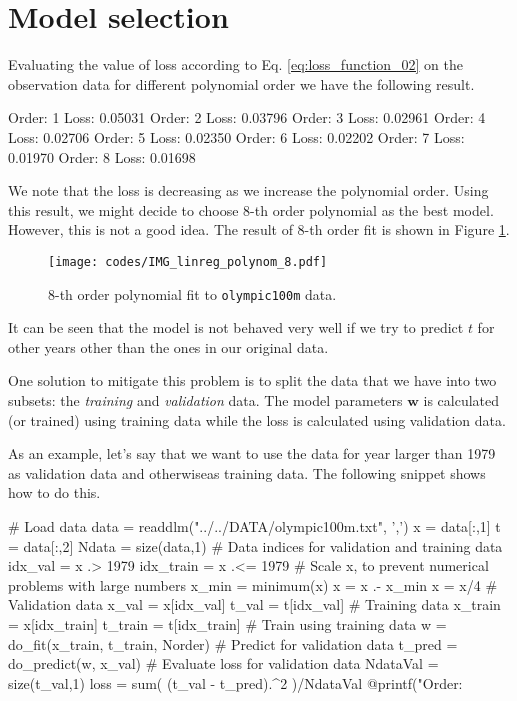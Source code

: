 \documentclass[a4paper,11pt]{article} %
\newcommand{\txtinline}[1]{\texttt{#1}}
\begin{document}
\section{Model selection}

Evaluating the value of loss according to Eq. \eqref{eq:loss_function_02}
on the observation data for different polynomial order
we have the following result.
\begin{textcode}
Order:   1 Loss:    0.05031
Order:   2 Loss:    0.03796
Order:   3 Loss:    0.02961
Order:   4 Loss:    0.02706
Order:   5 Loss:    0.02350
Order:   6 Loss:    0.02202
Order:   7 Loss:    0.01970
Order:   8 Loss:    0.01698    
\end{textcode}
We note that the loss is decreasing as we increase the polynomial order.
Using this result, we might decide to choose 8-th order polynomial as the
best model. However, this is not a good idea.
The result of 8-th order fit is shown in Figure \ref{fig:8th_order_fit}.
\begin{figure}[H]
\begin{center}
\texttt{[image: codes/IMG\_linreg\_polynom\_8.pdf]}
\end{center}
\caption{8-th order polynomial fit to \txtinline{olympic100m} data.}
\label{fig:8th_order_fit}
\end{figure}
It can be seen that the model is not behaved very well if we try to predict
$t$ for other years other than the ones in our original data.

One solution to mitigate this problem is to split the data that we have
into two subsets: the \emph{training} and \emph{validation} data.
The model parameters $\mathbf{w}$ is calculated (or trained) using
training data while the loss is calculated using validation data.

As an example, let's say that we want to use the data for year larger
than 1979 as validation data and otherwiseas training data. The following
snippet shows how to do this.
\begin{juliacode}
# Load data
data = readdlm("../../DATA/olympic100m.txt", ',')
x = data[:,1]
t = data[:,2]
Ndata = size(data,1)
# Data indices for validation and training data
idx_val = x .> 1979
idx_train = x .<= 1979
# Scale x, to prevent numerical problems with large numbers
x_min = minimum(x)
x = x .- x_min
x = x/4
# Validation data
x_val = x[idx_val]
t_val = t[idx_val]
# Training data
x_train = x[idx_train]
t_train = t[idx_train]
# Train using training data
w = do_fit(x_train, t_train, Norder)
# Predict for validation data
t_pred = do_predict(w, x_val)
# Evaluate loss for validation data
NdataVal = size(t_val,1)
loss = sum( (t_val - t_pred).^2 )/NdataVal
@printf("Order: %
\end{juliacode}
\end{document}
